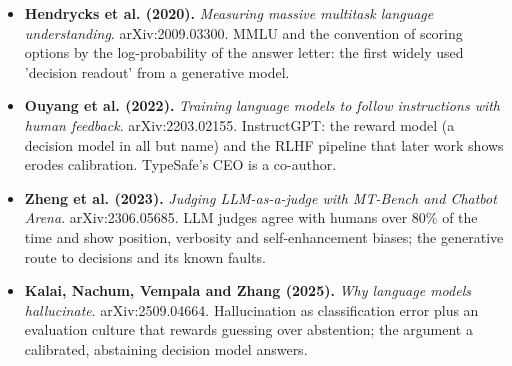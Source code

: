 \documentclass[11pt,letterpaper]{article}
\begin{document}
\begin{itemize}[leftmargin=1.2em,itemsep=3pt]
\item \textbf{Hendrycks et al. (2020).} \textit{Measuring massive multitask language understanding}. arXiv:2009.03300. MMLU and the convention of scoring options by the log-probability of the answer letter: the first widely used 'decision readout' from a generative model.
\item \textbf{Ouyang et al. (2022).} \textit{Training language models to follow instructions with human feedback}. arXiv:2203.02155. InstructGPT: the reward model (a decision model in all but name) and the RLHF pipeline that later work shows erodes calibration. TypeSafe's CEO is a co-author.
\item \textbf{Zheng et al. (2023).} \textit{Judging LLM-as-a-judge with MT-Bench and Chatbot Arena}. arXiv:2306.05685. LLM judges agree with humans over 80\% of the time and show position, verbosity and self-enhancement biases; the generative route to decisions and its known faults.
\item \textbf{Kalai, Nachum, Vempala and Zhang (2025).} \textit{Why language models hallucinate}. arXiv:2509.04664. Hallucination as classification error plus an evaluation culture that rewards guessing over abstention; the argument a calibrated, abstaining decision model answers.
\end{itemize}
\end{document}
